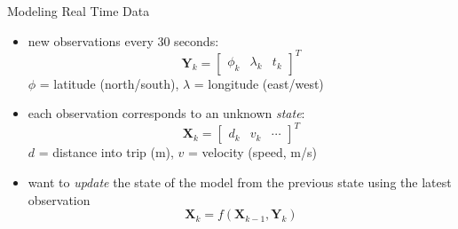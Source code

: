 \documentclass[10pt,t]{beamer}
\newcommand{\bX}{\mathbf{X}}
\newcommand{\bY}{\mathbf{Y}}
\begin{document}
\begin{frame}{Modeling Real Time Data}
  \onslide<+->
  \begin{itemize}[<+- | alert@+>]
    \item new observations every 30 seconds:
      \begin{equation*}
        \bY_k =
        \begin{bmatrix}
          \phi_k & \lambda_k & t_k
        \end{bmatrix}^T
      \end{equation*}
      $\phi$ = latitude (north/south), $\lambda$ = longitude (east/west)

    \item each observation corresponds to an unknown \emph{state}:
      \begin{equation*}
        \bX_k =
        \begin{bmatrix}
          d_k & v_k & \cdots
        \end{bmatrix}^T
      \end{equation*}
      $d$ = distance into trip (m), $v$ = velocity (speed, m/s)

    \item want to \emph{update} the state of the model from the previous state using the latest observation
      \begin{equation*}
        \bX_k = f(\bX_{k-1}, \bY_k)
      \end{equation*}
  \end{itemize}
  \onslide<+->
\end{frame}
\end{document}

